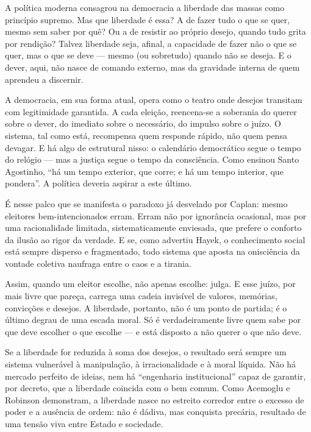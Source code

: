 \begin{apendicesenv}
\vspace{1em}

A política moderna consagrou na democracia a liberdade das massas como princípio supremo. Mas que liberdade é essa? A de fazer tudo o que se quer, mesmo sem saber por quê? Ou a de resistir ao próprio desejo, quando tudo grita por rendição? Talvez liberdade seja, afinal, a capacidade de fazer não o que se quer, mas o que se deve — mesmo (ou sobretudo) quando não se deseja. E o dever, aqui, não nasce de comando externo, mas da gravidade interna de quem aprendeu a discernir.

A democracia, em sua forma atual, opera como o teatro onde desejos transitam com legitimidade garantida. A cada eleição, reencena-se a soberania do querer sobre o dever, do imediato sobre o necessário, do impulso sobre o juízo. O sistema, tal como está, recompensa quem responde rápido, não quem pensa devagar. E há algo de estrutural nisso: o calendário democrático segue o tempo do relógio — mas a justiça segue o tempo da consciência. Como ensinou Santo Agostinho, “há um tempo exterior, que corre; e há um tempo interior, que pondera”. A política deveria aspirar a este último.

É nesse palco que se manifesta o paradoxo já desvelado por Caplan: mesmo eleitores bem-intencionados erram. Erram não por ignorância ocasional, mas por uma racionalidade limitada, sistematicamente enviesada, que prefere o conforto da ilusão ao rigor da verdade. E se, como advertiu Hayek, o conhecimento social está sempre disperso e fragmentado, todo sistema que aposta na onisciência da vontade coletiva naufraga entre o caos e a tirania.

Assim, quando um eleitor escolhe, não apenas escolhe: julga. E esse juízo, por mais livre que pareça, carrega uma cadeia invisível de valores, memórias, convicções e desejos. A liberdade, portanto, não é um ponto de partida; é o último degrau de uma escada moral. Só é verdadeiramente livre quem sabe por que deve escolher o que escolhe — e está disposto a não querer o que não deve.

Se a liberdade for reduzida à soma dos desejos, o resultado será sempre um sistema vulnerável à manipulação, à irracionalidade e à moral líquida. Não há mercado perfeito de ideias, nem há “engenharia institucional” capaz de garantir, por decreto, que a liberdade coincida com o bem comum. Como Acemoglu e Robinson demonstram, a liberdade nasce no estreito corredor entre o excesso de poder e a ausência de ordem: não é dádiva, mas conquista precária, resultado de uma tensão viva entre Estado e sociedade.


\end{apendicesenv}
